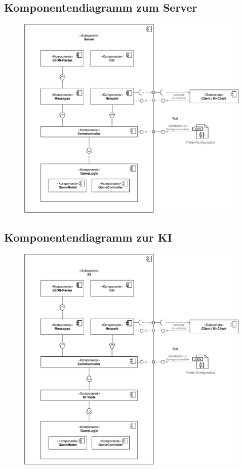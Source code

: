 
\subsection{Komponentendiagramm zum Server}
\begin{figure}[H]
    \centering
    \includegraphics[scale=0.85]{../Endabnahme/images/ServerDiagramme.pdf}
\end{figure}

\subsection{Komponentendiagramm zur KI}
\begin{figure}[H]
    \centering
    \includegraphics[scale=0.85]{../Endabnahme/images/KiDiagramme.pdf}
\end{figure}